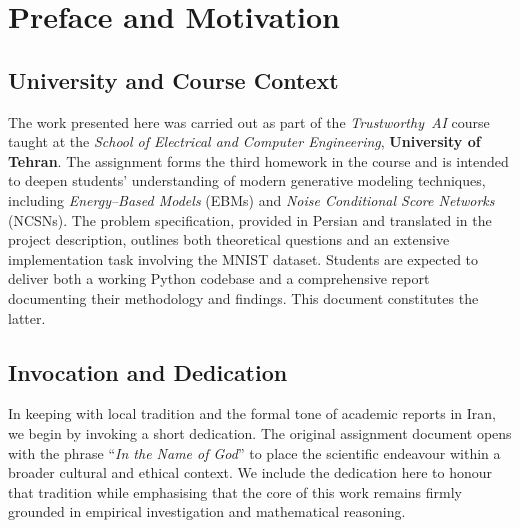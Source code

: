 

\section{Preface and Motivation}

\subsection{University and Course Context}

The work presented here was carried out as part of the \emph{Trustworthy~AI}
course taught at the \textit{School of Electrical and Computer Engineering},
\textbf{University of Tehran}.  The assignment forms the third homework in
the course and is intended to deepen students' understanding of modern
generative modeling techniques, including \emph{Energy–Based Models}
(EBMs) and \emph{Noise Conditional Score Networks} (NCSNs).  The problem
specification, provided in Persian and translated in the project description,
outlines both theoretical questions and an extensive implementation task
involving the MNIST dataset.  Students are expected to deliver both a working
Python codebase and a comprehensive report documenting their methodology and
findings.  This document constitutes the latter.

\subsection{Invocation and Dedication}

In keeping with local tradition and the formal tone of academic reports in
Iran, we begin by invoking a short dedication.  The original assignment
document opens with the phrase ``\emph{In the Name of God}'' to place the
scientific endeavour within a broader cultural and ethical context.  We
include the dedication here to honour that tradition while emphasising that
the core of this work remains firmly grounded in empirical investigation and
mathematical reasoning.

